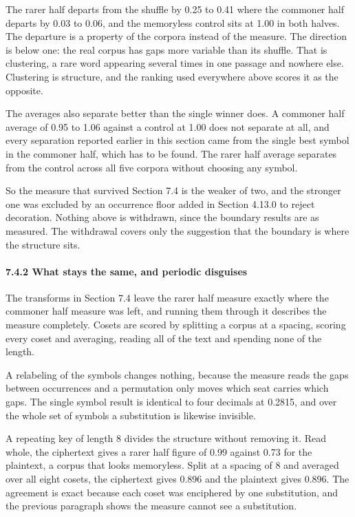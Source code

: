 The rarer half departs from the shuffle by 0.25 to 0.41 where the commoner half departs by 0.03 to 0.06, and the memoryless control sits at 1.00 in both halves. The departure is a property of the corpora instead of the measure. The direction is below one: the real corpus has gaps more variable than its shuffle. That is clustering, a rare word appearing several times in one passage and nowhere else. Clustering is structure, and the ranking used everywhere above scores it as the opposite.

The averages also separate better than the single winner does. A commoner half average of 0.95 to 1.06 against a control at 1.00 does not separate at all, and every separation reported earlier in this section came from the single best symbol in the commoner half, which has to be found. The rarer half average separates from the control across all five corpora without choosing any symbol.

So the measure that survived Section 7.4 is the weaker of two, and the stronger one was excluded by an occurrence floor added in Section 4.13.0 to reject decoration. Nothing above is withdrawn, since the boundary results are as measured. The withdrawal covers only the suggestion that the boundary is where the structure sits.

\paragraph{7.4.2 What stays the same, and periodic disguises}

The transforms in Section 7.4 leave the rarer half measure exactly where the commoner half measure was left, and running them through it describes the measure completely. Cosets are scored by splitting a corpus at a spacing, scoring every coset and averaging, reading all of the text and spending none of the length.

A relabeling of the symbols changes nothing, because the measure reads the gaps between occurrences and a permutation only moves which seat carries which gaps. The single symbol result is identical to four decimals at 0.2815, and over the whole set of symbols a substitution is likewise invisible.

A repeating key of length 8 divides the structure without removing it. Read whole, the ciphertext gives a rarer half figure of 0.99 against 0.73 for the plaintext, a corpus that looks memoryless. Split at a spacing of 8 and averaged over all eight cosets, the ciphertext gives 0.896 and the plaintext gives 0.896. The agreement is exact because each coset was enciphered by one substitution, and the previous paragraph shows the measure cannot see a substitution.

